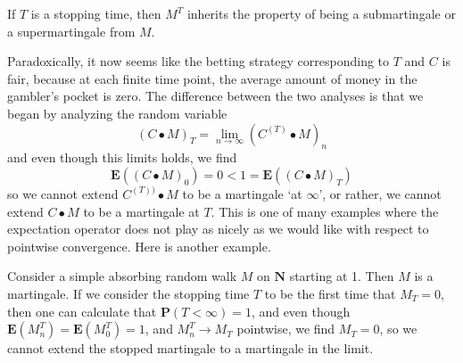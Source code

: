 \begin{theorem}
    If $T$ is a stopping time, then $M^T$ inherits the property of being a submartingale or a supermartingale from $M$.
\end{theorem}

Paradoxically, it now seems like the betting strategy corresponding to $T$ and $C$ is fair, because at each finite time point, the average amount of money in the gambler's pocket is zero. The difference between the two analyses is that we began by analyzing the random variable
%
\[ (C \bullet M)_T = \lim_{n \to \infty} (C^{(T)} \bullet M)_n \]
%
and even though this limits holds, we find
%
\[ \mathbf{E}((C \bullet M)_0) = 0 < 1 = \mathbf{E}((C \bullet M)_T) \]
%
so we cannot extend $C^{(T))} \bullet M$ to be a martingale `at $\infty$', or rather, we cannot extend $C \bullet M$ to be a martingale at $T$. This is one of many examples where the expectation operator does not play as nicely as we would like with respect to pointwise convergence. Here is another example.

\begin{example}
    Consider a simple absorbing random walk $M$ on $\mathbf{N}$ starting at 1. Then $M$ is a martingale. If we consider the stopping time $T$ to be the first time that $M_T = 0$, then one can calculate that $\mathbf{P}(T < \infty) = 1$, and even though $\mathbf{E}(M^T_n) = \mathbf{E}(M^T_0) = 1$, and $M^T_n \to M_T$ pointwise, we find $M_T = 0$, so we cannot extend the stopped martingale to a martingale in the limit.
\end{example}

